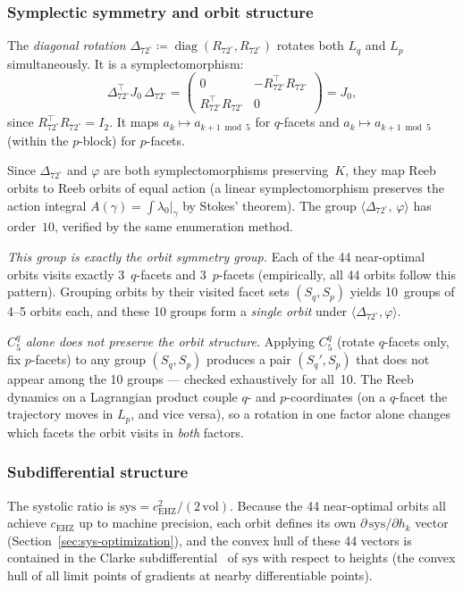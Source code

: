\subsubsection*{Symplectic symmetry and orbit structure}

The \emph{diagonal rotation}
$\Delta_{72^\circ} \coloneqq \operatorname{diag}(R_{72^\circ}, R_{72^\circ})$
rotates both $L_q$ and $L_p$ simultaneously.
It is a symplectomorphism:
\[
  \Delta_{72^\circ}^\top J_0\, \Delta_{72^\circ}
  = \begin{pmatrix} 0 & -R_{72^\circ}^\top R_{72^\circ} \\
    R_{72^\circ}^\top R_{72^\circ} & 0 \end{pmatrix}
  = J_0,
\]
since $R_{72^\circ}^\top R_{72^\circ} = I_2$.
It maps $a_k \mapsto a_{k+1\bmod 5}$ for $q$-facets and
$a_k \mapsto a_{k+1\bmod 5}$ (within the $p$-block) for $p$-facets.

Since $\Delta_{72^\circ}$ and $\varphi$ are both symplectomorphisms
preserving~$K$,
they map Reeb orbits to Reeb orbits of equal action
(a linear symplectomorphism preserves the action integral
$A(\gamma) = \int \lambda_0|_\gamma$ by Stokes' theorem).
The group $\langle \Delta_{72^\circ},\, \varphi \rangle$ has order~$10$,
verified by the same enumeration method.

\emph{This group is exactly the orbit symmetry group.}
Each of the 44 near-optimal orbits visits exactly
3~$q$-facets and 3~$p$-facets (empirically, all 44 orbits follow this
pattern).
Grouping orbits by their visited facet sets $(S_q, S_p)$ yields
10~groups of 4--5 orbits each, and these 10 groups form a
\emph{single orbit} under $\langle \Delta_{72^\circ}, \varphi \rangle$.

\emph{$C_5^q$ alone does not preserve the orbit structure.}
Applying $C_5^q$ (rotate $q$-facets only, fix $p$-facets) to any
group $(S_q, S_p)$ produces a pair $(S_q', S_p)$ that does not
appear among the 10 groups ---
checked exhaustively for all~10.
The Reeb dynamics on a Lagrangian product couple $q$- and
$p$-coordinates (on a $q$-facet
the trajectory moves in $L_p$, and vice versa), so a rotation
in one factor alone changes which facets the orbit visits in
\emph{both} factors.

\subsubsection*{Subdifferential structure}

The systolic ratio is $\mathrm{sys} = c_{\mathrm{EHZ}}^2 / (2\,\mathrm{vol})$.
Because the 44 near-optimal orbits all achieve $c_{\mathrm{EHZ}}$ up to
machine precision, each orbit defines its own
$\partial\,\mathrm{sys}/\partial h_k$ vector
(Section~\ref{sec:sys-optimization}),
and the convex hull of these 44 vectors is contained in the Clarke
subdifferential~\cite{Clarke1983} of $\mathrm{sys}$ with respect to
heights (the convex hull of all limit points of gradients at nearby
differentiable points).

